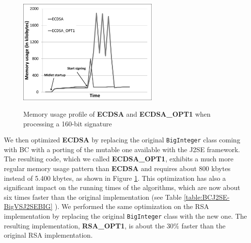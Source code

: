 \documentclass[authoryear]{elsarticle}
\begin{document}
\begin{figure}[ht]
\begin{center}
  \includegraphics[width=7cm]{immagini/MemoryECDSA_OPT1.pdf}\\
  \caption{Memory usage profile of \textbf{ECDSA} and \textbf{ECDSA\_OPT1} when processing a 160-bit signature}
  \label{fig:MemoryECDSA_OPT1}
\end{center}
\end{figure}

We then optimized \textbf{ECDSA}  by replacing the original {\tt BigInteger} class coming with BC with a porting of the mutable one available with the J2SE framework. The resulting code, which we called \textbf{ECDSA\_OPT1}, exhibits a much more regular memory usage pattern than \textbf{ECDSA} and requires about 800 kbytes instead of 5.400 kbytes, as shown in Figure \ref{fig:MemoryECDSA_OPT1}. This optimization has also a significant impact on the running times of the algorithms, which are now about six times faster than the original implementation (see Table \ref{table:BCJ2SE-BigVSJ2SEBIG} ). We performed the same optimization on the RSA implementation by replacing the original {\tt BigInteger} class with the new one. The resulting implementation, \textbf{RSA\_OPT1}, is about the $30\%$ faster than the original RSA implementation.


\end{document}

